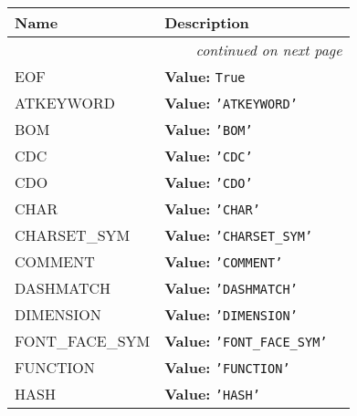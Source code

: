     \vspace{-1cm}
\hspace{\varindent}\begin{longtable}{|p{\varnamewidth}|p{\vardescrwidth}|l}
\cline{1-2}
\cline{1-2} \centering \textbf{Name} & \centering \textbf{Description}& \\
\cline{1-2}
\endhead\cline{1-2}\multicolumn{3}{r}{\small\textit{continued on next page}}\\\endfoot\cline{1-2}
\endlastfoot\raggedright E\-O\-F\- & \raggedright \textbf{Value:} 
{\tt True}&\\
\cline{1-2}
\raggedright A\-T\-K\-E\-Y\-W\-O\-R\-D\- & \raggedright \textbf{Value:} 
{\tt \texttt{'}\texttt{ATKEYWORD}\texttt{'}}&\\
\cline{1-2}
\raggedright B\-O\-M\- & \raggedright \textbf{Value:} 
{\tt \texttt{'}\texttt{BOM}\texttt{'}}&\\
\cline{1-2}
\raggedright C\-D\-C\- & \raggedright \textbf{Value:} 
{\tt \texttt{'}\texttt{CDC}\texttt{'}}&\\
\cline{1-2}
\raggedright C\-D\-O\- & \raggedright \textbf{Value:} 
{\tt \texttt{'}\texttt{CDO}\texttt{'}}&\\
\cline{1-2}
\raggedright C\-H\-A\-R\- & \raggedright \textbf{Value:} 
{\tt \texttt{'}\texttt{CHAR}\texttt{'}}&\\
\cline{1-2}
\raggedright C\-H\-A\-R\-S\-E\-T\-\_\-S\-Y\-M\- & \raggedright \textbf{Value:} 
{\tt \texttt{'}\texttt{CHARSET\_SYM}\texttt{'}}&\\
\cline{1-2}
\raggedright C\-O\-M\-M\-E\-N\-T\- & \raggedright \textbf{Value:} 
{\tt \texttt{'}\texttt{COMMENT}\texttt{'}}&\\
\cline{1-2}
\raggedright D\-A\-S\-H\-M\-A\-T\-C\-H\- & \raggedright \textbf{Value:} 
{\tt \texttt{'}\texttt{DASHMATCH}\texttt{'}}&\\
\cline{1-2}
\raggedright D\-I\-M\-E\-N\-S\-I\-O\-N\- & \raggedright \textbf{Value:} 
{\tt \texttt{'}\texttt{DIMENSION}\texttt{'}}&\\
\cline{1-2}
\raggedright F\-O\-N\-T\-\_\-F\-A\-C\-E\-\_\-S\-Y\-M\- & \raggedright \textbf{Value:} 
{\tt \texttt{'}\texttt{FONT\_FACE\_SYM}\texttt{'}}&\\
\cline{1-2}
\raggedright F\-U\-N\-C\-T\-I\-O\-N\- & \raggedright \textbf{Value:} 
{\tt \texttt{'}\texttt{FUNCTION}\texttt{'}}&\\
\cline{1-2}
\raggedright H\-A\-S\-H\- & \raggedright \textbf{Value:} 
{\tt \texttt{'}\texttt{HASH}\texttt{'}}&\\
\cline{1-2}

\end{longtable}
